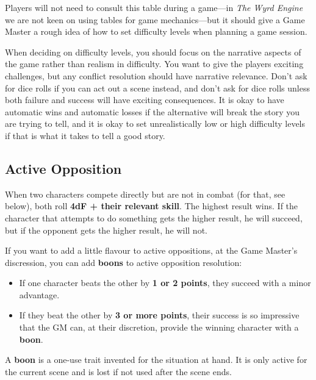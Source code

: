 Players will not need to consult this table during a game---in \emph{The Wyrd Engine} we are not keen on using tables for game mechanics---but it should give a Game Master a rough idea of how to set difficulty levels when planning a game session.


\begin{WyrdGmTips}
	When deciding on difficulty levels, you should focus on the narrative aspects of the game rather than realism in difficulty. You want to give the players exciting challenges, but any conflict resolution should have narrative relevance. Don't ask for dice rolls if you can act out a scene instead, and don't ask for dice rolls unless both failure and success will have exciting consequences. It is okay to have automatic wins and automatic losses if the alternative will break the story you are trying to tell, and it is okay to set unrealistically low or high difficulty levels if that is what it takes to tell a good story.
\end{WyrdGmTips}



\subsection{Active Opposition}
When two characters compete directly but are not in combat (for that, see below), both roll \textbf{4dF + their relevant skill}. The highest result wins. If the character that attempts to do something gets the higher result, he will succeed, but if the opponent gets the higher result, he will not.

If you want to add a little flavour to active oppositions, at the Game Master's discression, you can add \textbf{boons} to active opposition resolution:

\begin{WyrdExplanation}
	\begin{itemize}
    	\item If one character beats the other by \textbf{1 or 2 points}, they succeed with a minor advantage.
	    \item If they beat the other by \textbf{3 or more points}, their success is so impressive that the GM can, at their discretion, provide the winning character with a \textbf{boon}.
	\end{itemize}
\end{WyrdExplanation}

A \textbf{boon} is a one-use trait invented for the situation at hand. It is only active for the current scene and is lost if not used after the scene ends.

